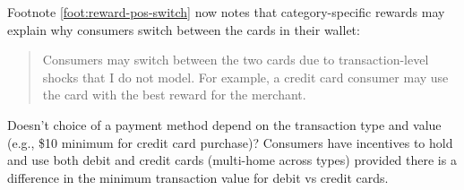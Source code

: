 \documentclass[main.tex]{subfiles}
\begin{document}
\begin{refsection}

Footnote \ref{foot:reward-pos-switch} now notes that category-specific rewards may explain why consumers switch between the cards in their wallet:
\begin{quote}
    Consumers may switch between the two cards due to transaction-level shocks that I do not model.
For example, a credit card consumer may use the card with the best reward for the merchant.
\end{quote}

\begin{refcomment}
Doesn't choice of a payment method depend on the transaction type and value (e.g., \$10 minimum for credit card purchase)?
Consumers have incentives to hold and use both debit and credit cards (multi-home across types) provided there is a difference in the minimum transaction value for debit vs credit cards.
\end{refcomment}


\end{refsection}
\end{document}
